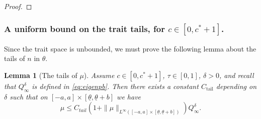 \documentclass[11pt]{article}    %
\newcommand{\EB}[1]{\textcolor{blue}{#1}}
\newtheorem{lemma}[theorem]{Lemma}
\begin{document}
\begin{proof}
%
%

\end{proof}







\subsubsection*{A uniform bound on the trait tails, for $c \in [0,c^* +1]$.}

Since the trait space is unbounded, we must prove the following lemma about the tails of $n$ in $\theta$.

\begin{lemma}[The tails of $\mu$]\label{lem:tails}
Assume $c \in \left[ 0 , c^* + 1 \right]$, $\tau \in [0,1]$, $\delta > 0$, and recall that $Q_\infty^\delta$ is defined in \eqref{eq:eigenpb}. Then there exists a constant $C_{\text{tail}}$ depending on $\delta$ such that on $[-a,a]\times[\underline\theta, \underline\theta+ b]$ we have
\begin{equation*}
	\mu
		\leq C_{tail} \left(1 + \|\mu\|_{L^\infty([-a,a]\times[\underline\theta,\underline\theta+b])}\right) Q_\infty^\delta.
\end{equation*}
\end{lemma}
\end{document}
